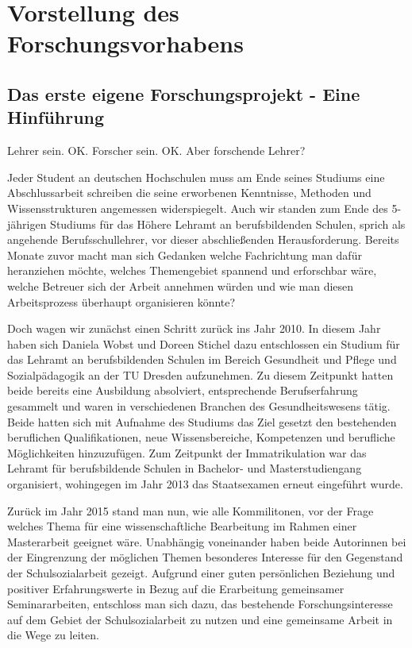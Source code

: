 \section{Vorstellung des Forschungsvorhabens}
\label{sec:VorstellungDesForschungsvorhabens}

\subsection{Das erste eigene Forschungsprojekt - Eine Hinführung}
\label{sec:DasErsteEigeneForschungsprojektEineHinführung}

Lehrer sein. OK. Forscher sein. OK. Aber forschende Lehrer?

Jeder Student an deutschen Hochschulen muss am Ende seines Studiums eine Abschlussarbeit schreiben die seine erworbenen Kenntnisse, Methoden und Wissensstrukturen angemessen widerspiegelt. Auch wir standen zum Ende des 5-jährigen Studiums für das Höhere Lehramt an berufsbildenden Schulen, sprich als angehende Berufsschullehrer, vor dieser abschließenden Herausforderung. Bereits Monate zuvor macht man sich Gedanken welche Fachrichtung man dafür heranziehen möchte, welches Themengebiet spannend und erforschbar wäre, welche Betreuer sich der Arbeit annehmen würden und wie man diesen Arbeitsprozess überhaupt organisieren könnte? 

Doch wagen wir zunächst einen Schritt zurück ins Jahr 2010. In diesem Jahr haben sich Daniela Wobst und Doreen Stichel dazu entschlossen ein Studium für das Lehramt an berufsbildenden Schulen im Bereich Gesundheit und Pflege und Sozialpädagogik an der TU Dresden aufzunehmen. Zu diesem Zeitpunkt hatten beide bereits eine Ausbildung absolviert, entsprechende Berufserfahrung gesammelt und waren in verschiedenen Branchen des Gesundheitswesens tätig. Beide hatten sich mit Aufnahme des Studiums das Ziel gesetzt den bestehenden beruflichen Qualifikationen, neue Wissensbereiche, Kompetenzen und berufliche Möglichkeiten hinzuzufügen. Zum Zeitpunkt der Immatrikulation war das Lehramt für berufsbildende Schulen in Bachelor- und Masterstudiengang organisiert, wohingegen im Jahr 2013 das Staatsexamen erneut eingeführt wurde. 

Zurück im Jahr 2015 stand man nun, wie alle Kommilitonen, vor der Frage welches Thema für eine wissenschaftliche Bearbeitung im Rahmen einer Masterarbeit geeignet wäre. Unabhängig voneinander haben beide Autorinnen bei der Eingrenzung der möglichen Themen besonderes Interesse für den Gegenstand der Schulsozialarbeit gezeigt. Aufgrund einer guten persönlichen Beziehung und positiver Erfahrungswerte in Bezug auf die Erarbeitung gemeinsamer Seminararbeiten, entschloss man sich dazu, das bestehende Forschungsinteresse auf dem Gebiet der Schulsozialarbeit zu nutzen und eine gemeinsame Arbeit in die Wege zu leiten. 


